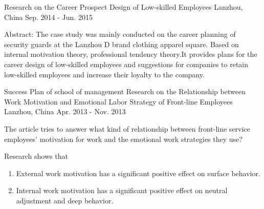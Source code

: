 \begin{cventries}
    {Research on the Career Prospect Design of Low-skilled Employees}
    {Lanzhou, China}
    {Sep. 2014 - Jun. 2015}
    {
      \begin{cvitems}
      \item {Abstract: The case study was mainly conducted on the career planning of security guards at the Lanzhou D brand clothing apparel square. Based on internal motivation theory, professional tendency theory.It provides plans for the career design of low-skilled employees and suggestions for companies to retain low-skilled employees and increase their loyalty to the company.}
      \end{cvitems}
    }
  \cventry
    {Success Plan of school of management}
    {Research on the Relationship between Work Motivation and Emotional Labor Strategy of Front-line Employees}
    {Lanzhou, China}
    {Apr. 2013 - Nov. 2013}
    {
      \begin{cvitems}
        \item {The article tries to answer what kind of relationship between front-line service employees' motivation for work and the emotional work strategies they use?}
	\item {Research shows that}
	\begin{enumerate}
	    \item {External work motivation has a significant positive effect on surface behavior.}
	    \item {Internal work motivation has a significant positive effect on neutral adjustment and deep behavior.}
	\end{enumerate}
      \end{cvitems} 
    }
\end{cventries}

